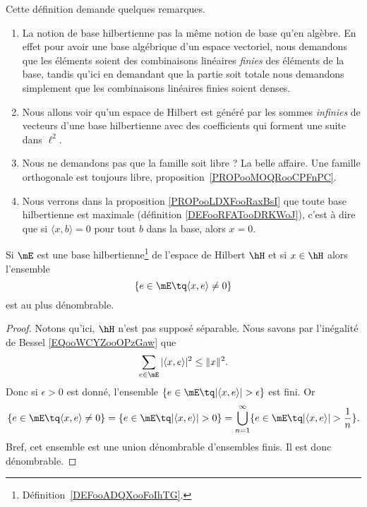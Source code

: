\begin{normaltext}
	Cette définition demande quelques remarques.

	\begin{enumerate}
		\item
		      La notion de base hilbertienne pas la même notion de base qu'en algèbre. En effet pour avoir une base algébrique d'un espace vectoriel, nous demandons que les éléments soient des combinaisons linéaires \emph{finies} des éléments de la base, tandis qu'ici en demandant que la partie soit totale nous demandons simplement que les combinaisons linéaires finies soient denses.
		\item
		      Nous allons voir qu'un espace de Hilbert est généré par les sommes \emph{infinies} de vecteurs d'une base hilbertienne avec des coefficients qui forment une suite dans \( \ell^2\).
		\item
		      Nous ne demandons pas que la famille soit libre ? La belle affaire. Une famille orthogonale est toujours libre, proposition~\ref{PROPooMOQRooCPFnPC}.
		\item
		      Nous verrons dans la proposition \ref{PROPooLDXFooRaxBsI} que toute base hilbertienne est maximale (définition \ref{DEFooRFATooDRKWoJ}), c'est à dire que si \( \langle x, b\rangle =0\) pour tout \( b\) dans la base, alors \( x=0\).
	\end{enumerate}
\end{normaltext}

\begin{lemma}       \label{LEMooHWOBooQJKdTD}
	Si \( \mE\) est une base hilbertienne\footnote{Définition~\ref{DEFooADQXooFoIhTG}.} de l'espace de Hilbert \( \hH\) et si \( x\in \hH\) alors l'ensemble
	\begin{equation}
		\{ e\in\mE\tq \langle x, e\rangle \neq 0 \}
	\end{equation}
	est au plus dénombrable.
\end{lemma}

\begin{proof}
	Notons qu'ici, \( \hH\) n'est pas supposé séparable. Nous savons par l'inégalité de Bessel \eqref{EQooWCYZooOPzGaw} que
	\begin{equation}
		\sum_{e\in\mE}| \langle x, e\rangle  |^2\leq \| x \|^2.
	\end{equation}
	Donc si \( \epsilon>0\) est donné, l'ensemble \( \{ e\in \mE\tq| \langle x, e\rangle  |>\epsilon \}\) est fini. Or
	\begin{equation}
		\{ e\in\mE\tq \langle x, e\rangle \neq 0  \}=\{ e\in\mE\tq| \langle x, e\rangle  |>0 \}=\bigcup_{n=1}^{\infty}\{ e\in\mE\tq | \langle x, e\rangle  |>\frac{1}{ n } \}.
	\end{equation}
	Bref, cet ensemble est une union dénombrable d'ensembles finis. Il est donc dénombrable.
\end{proof}

